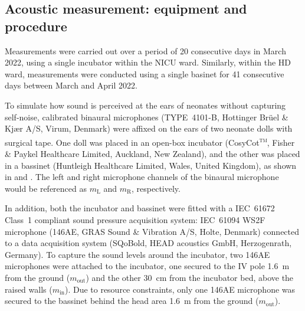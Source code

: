 \subsection{Acoustic measurement: equipment and procedure}

\iftodo
\begin{itemize}[leftmargin=*]
    \begin{itemize}
    \end{itemize}
    \begin{itemize}
    \end{itemize}
\end{itemize}
\fi

Measurements were carried out over a period of 20 consecutive days in March 2022, using a single incubator within the NICU ward. Similarly, within the HD ward, measurements were conducted using a single basinet for 41 consecutive days between March and April 2022.



To simulate how sound is perceived at the ears of neonates without capturing self-noise, calibrated binaural microphones (TYPE~4101\nobreakdash-B, Hottinger Brüel \& Kjær A/S, Virum, Denmark) were affixed on the ears of two neonate dolls with surgical tape. One doll was placed in an open-box incubator (CosyCot\textsuperscript{\textsc{tm}}, Fisher \& Paykel Healthcare Limited, Auckland, New Zealand), and the other was placed in a bassinet (Huntleigh Healthcare Limited, Wales, United Kingdom), as shown in  and . The left and right microphone channels of the binaural microphone would be referenced as $m_\text{L}$ and $m_\text{R}$, respectively.  

In addition, both the incubator and bassinet were fitted with a IEC~61672 Class~1 compliant sound pressure acquisition system: IEC~61094 WS2F microphone (146AE, GRAS Sound \& Vibration A/S, Holte, Denmark) connected to a data acquisition system (SQoBold, HEAD acoustics GmbH, Herzogenrath, Germany). To capture the sound levels around the incubator, two 146AE microphones were attached to the incubator, one secured to the IV pole \SI{1.6}{\meter} from the ground ($m_\text{out}$) and the other \SI{30}{\centi\meter} from the incubator bed, above the raised walls ($m_\text{in}$). Due to resource constraints, only one 146AE microphone was secured to the bassinet behind the head area \SI{1.6}{\meter} from the ground ($m_\text{out}$).

